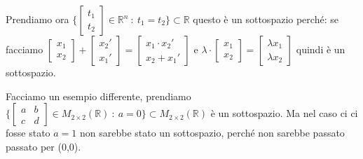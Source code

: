 \begin{example}
Prendiamo ora $\Bigg \{\begin{bmatrix}t_1\\ t_2\end{bmatrix} \in \mathbb{R}^n \: : \: t_1 = t_2\Bigg\} \subset \mathbb{R}$ questo è un sottospazio perché:
se facciamo $\begin{bmatrix}x_1\\x_2\end{bmatrix} + \begin{bmatrix}x_2'\\x_1'\end{bmatrix} = \begin{bmatrix}x_1 \cdot x_2'\\x_2 + x_1'\end{bmatrix}$ e $\lambda \cdot\begin{bmatrix}x_1 \\ x_2\end{bmatrix} = \begin{bmatrix}\lambda x_1 \\ \lambda x_2\end{bmatrix}$ quindi è un sottospazio.
\end{example}

\begin{example}
Facciamo un esempio differente, prendiamo $\Bigg\{\begin{bmatrix}a & b \\ c & d\end{bmatrix} \in M_{2\times 2}(\mathbb{R})\: :\: a= 0 \Bigg\}\subset M_{2 \times 2}(\mathbb{R})$ è un sottospazio. Ma nel caso ci ci fosse stato $a=1$ non sarebbe stato un sottospazio, perché non sarebbe passato passato per (0,0).
\end{example}

